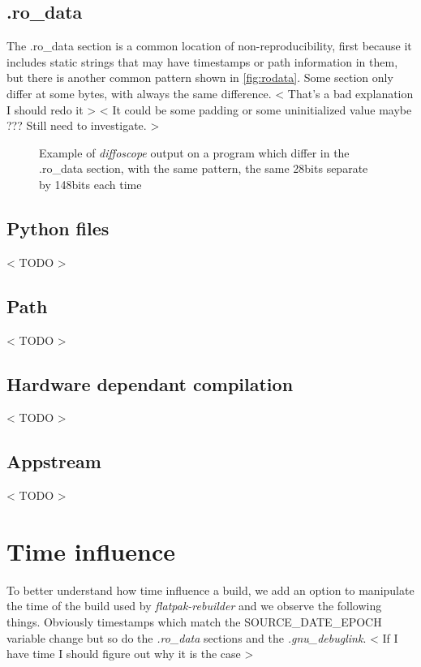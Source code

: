 \documentclass[a4paper,11pt,oneside]{report}
\theoremstyle{definition}
\newcommand{\sysname}{\emph{flatpak-rebuilder}\xspace}
\newcommand{\sde}{SOURCE\_DATE\_EPOCH\xspace}
\newcommand{\dfc}{\emph{diffoscope}\xspace}
\begin{document}
\subsection{.ro\_data}
The .ro\_data section is a common location of non-reproducibility, first
because it includes static strings that may have timestamps or path information
in them, but there is another common pattern shown in \autoref{fig:rodata}.
Some section only differ at some bytes, with always the same difference.
< That's a bad explanation I should redo it >
< It could be some padding or some uninitialized value maybe ??? Still need to investigate. >
\begin{figure}[h]
    \caption{Example of \dfc output on a program which differ in the .ro\_data section, with the same pattern, the same 28bits separate by 148bits each time}
    \label{fig:rodata}
\end{figure}

\subsection{Python files}
< TODO >

\subsection{Path}
< TODO >

\subsection{Hardware dependant compilation}
< TODO >

\subsection{Appstream}
< TODO >

\section{Time influence}
To better understand how time influence a build, we add an option to manipulate
the time of the build used by \sysname and we observe the following things.
Obviously timestamps which match the \sde variable change but so do the
\emph{.ro\_data} sections and the \emph{.gnu\_debuglink}.
< If I have time I should figure out why it is the case >
\end{document}
